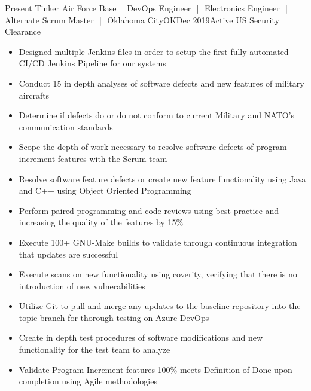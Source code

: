 %
%
%
\vspace*{-.15cm}
\textbf{}
\vspace*{-.35cm}
\begin{experiences}
  \consultantexperience
    {Present}   {Tinker Air Force Base\,\, |\,\,DevOps Engineer\,\, |\,\, Electronics Engineer\,\, |\,\, Alternate Scrum Master \,\,|\,\, Oklahoma City}{OK}{}{Dec 2019}{Active US Security Clearance}
    {} 
        {\begin{itemize}\small
            \item Designed multiple Jenkins files in order to setup the first fully automated CI/CD Jenkins Pipeline for our systems
            \item Conduct 15 in depth analyses of software defects and new features of military aircrafts
            \item Determine if defects do or do not conform to current Military and NATO's communication standards
            \item Scope the depth of work necessary to resolve software defects of program increment features with the Scrum team
            \item Resolve software feature defects or create new feature functionality using Java and C++ using Object Oriented Programming
            \item Perform paired programming and code reviews using best practice and increasing the quality of the features by 15\%
            \item Execute 100+ GNU-Make builds to validate through continuous integration that updates are successful
            \item Execute scans on new functionality using coverity, verifying that there is no introduction of new vulnerabilities
            \item Utilize Git to pull and merge any updates to the baseline repository into the topic branch for thorough testing on Azure DevOps
            \item Create in depth test procedures of software modifications and new functionality for the test team to analyze
            \item Validate Program Increment features 100\% meets Definition of Done upon completion using Agile methodologies

\end{itemize}}
\end{experiences}
